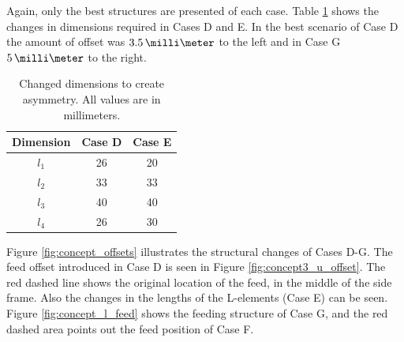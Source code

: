 Again, only the best structures are presented of each case. Table \ref{tab:concept3} shows the changes in dimensions required in Cases D and E. In the best scenario of Case D the amount of offset was $3.5\,\milli\meter$ to the left and in Case G $5\,\milli\meter$ to the right. 
\begin{table}[H]
    \centering
    \caption{Changed dimensions to create asymmetry. All values are in millimeters.}
    \label{tab:concept3}
    \begin{tabular}{|c|c|c|}
        \hline
        \textbf{Dimension} & \textbf{Case D} & \textbf{Case E}\\
        \hline
        $l_1$ & 26 & 20 \\
        \hline
        $l_2$ & 33 & 33\\
        \hline
        $l_3$ & 40 & 40\\
        \hline
        $l_4$ & 26 & 30\\
        \hline
    \end{tabular}
\end{table}

Figure \ref{fig:concept_offsets} illustrates the structural changes of Cases D-G. The feed offset introduced in Case D is seen in Figure \ref{fig:concept3_u_offset}. The red dashed line shows the original location of the feed, in the middle of the side frame. Also the changes in the lengths of the L-elements (Case E) can be seen. Figure \ref{fig:concept_l_feed} shows the feeding structure of Case G, and the red dashed area points out the feed position of Case F.

